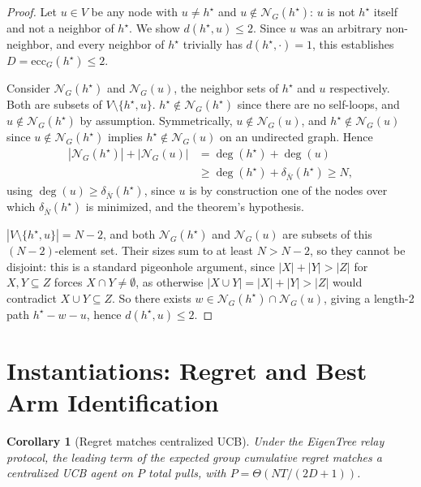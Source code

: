 \documentclass[letterpaper]{article} %
\newtheorem{corollary}{Corollary}
\begin{document}
\begin{proof}
Let $u \in V$ be any node with $u \neq h^\star$ and $u \notin
\mathcal{N}_G(h^\star)$: $u$ is not $h^\star$ itself and not a neighbor of
$h^\star$. We show $d(h^\star, u) \leq 2$. Since $u$ was an arbitrary
non-neighbor, and every neighbor of $h^\star$ trivially has
$d(h^\star,\cdot)=1$, this establishes $D = \mathrm{ecc}_G(h^\star) \leq 2$.

Consider $\mathcal{N}_G(h^\star)$ and $\mathcal{N}_G(u)$, the neighbor sets
of $h^\star$ and $u$ respectively. Both are subsets of $V \setminus
\{h^\star, u\}$. $h^\star \notin \mathcal{N}_G(h^\star)$ since there are no
self-loops, and $u \notin \mathcal{N}_G(h^\star)$ by assumption.
Symmetrically, $u \notin \mathcal{N}_G(u)$, and $h^\star \notin
\mathcal{N}_G(u)$ since $u \notin \mathcal{N}_G(h^\star)$ implies $h^\star
\notin \mathcal{N}_G(u)$ on an undirected graph. Hence
\begin{align*}
|\mathcal{N}_G(h^\star)| + |\mathcal{N}_G(u)| &= \deg(h^\star) + \deg(u) \\
&\geq \deg(h^\star) + \delta_{\bar N}(h^\star) \geq N,
\end{align*}
using $\deg(u) \geq \delta_{\bar N}(h^\star)$, since $u$ is by construction
one of the nodes over which $\delta_{\bar N}(h^\star)$ is minimized, and
the theorem's hypothesis.

$|V \setminus \{h^\star, u\}| = N - 2$, and both $\mathcal{N}_G(h^\star)$
and $\mathcal{N}_G(u)$ are subsets of this $(N-2)$-element set. Their sizes
sum to at least $N > N-2$, so they cannot be disjoint: this is a standard
pigeonhole argument, since $|X|+|Y| > |Z|$ for $X,Y\subseteq Z$ forces
$X\cap Y\neq\emptyset$, as otherwise $|X\cup Y| = |X|+|Y| > |Z|$ would
contradict $X\cup Y\subseteq Z$. So there exists $w \in
\mathcal{N}_G(h^\star)\cap\mathcal{N}_G(u)$, giving a length-2 path
$h^\star - w - u$, hence $d(h^\star,u)\leq 2$.
\end{proof}

\section{Instantiations: Regret and Best Arm Identification}

\begin{corollary}[Regret matches centralized UCB]
\label{cor:regret}
Under the EigenTree relay protocol, the leading term of the expected group
cumulative regret matches a centralized UCB agent on $P$ total pulls, with
$P = \Theta(NT/(2D+1))$.
\end{corollary}
\end{document}
